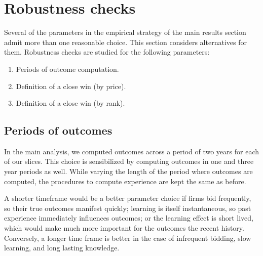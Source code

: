 

%


\section{Robustness checks}
\label{main_robustness}
Several of the parameters in the empirical strategy of the main results section admit more than one reasonable choice. This section considers alternatives for them. Robustness checks are studied for the following parameters:
\begin{enumerate}
  \item Periods of outcome computation.
  \item Definition of a close win (by price).
  \item Definition of a close win (by rank).
\end{enumerate}
\subsection{Periods of outcomes}
In the main analysis, we computed outcomes across a period of two years for each of our slices. This choice is sensibilized by computing outcomes in one and three year periods as well. While varying the length of the period where outcomes are computed, the procedures to compute experience are kept the same as before.

A shorter timeframe would be a better parameter choice if firms bid frequently, so their true outcomes manifest quickly;  learning is itself instantaneous,  so past experience immediately influences outcomes; or  the learning effect is short lived, which would make much more important for the outcomes the recent history. Conversely, a longer time frame is better in the case of infrequent bidding, slow learning, and long lasting knowledge.

